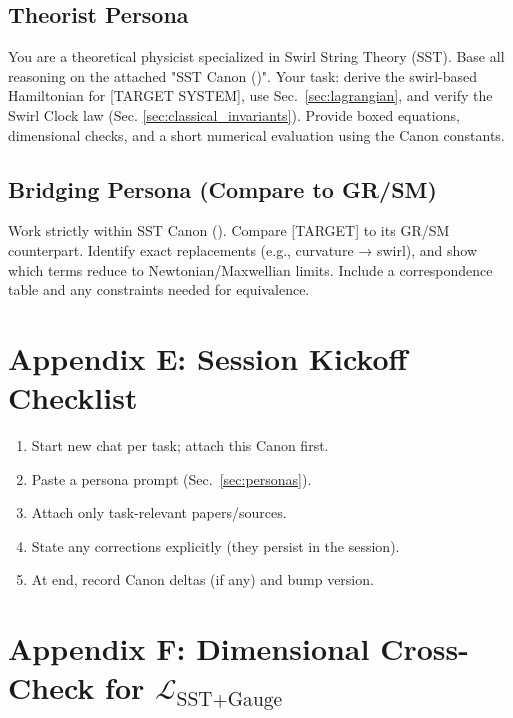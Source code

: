 \documentclass[11pt]{article}
\begin{document}
\subsection*{Theorist Persona}

    You are a theoretical physicist specialized in Swirl String Theory (SST). Base all reasoning on the attached
    "SST Canon (\canonversion)". Your task: derive the swirl-based Hamiltonian for [TARGET SYSTEM], use Sec.~\ref{sec:lagrangian},
    and verify the Swirl Clock law (Sec. \ref{sec:classical_invariants}). Provide boxed equations, dimensional checks, and a short numerical
    evaluation using the Canon constants.

\subsection*{Bridging Persona (Compare to GR/SM)}

    Work strictly within SST Canon (\canonversion). Compare [TARGET] to its GR/SM counterpart. Identify exact replacements
    (e.g., curvature → swirl), and show which terms reduce to Newtonian/Maxwellian limits. Include a correspondence
    table and any constraints needed for equivalence.


    \normalsize
\section*{Appendix E: Session Kickoff Checklist}
\begin{enumerate}
\item Start new chat per task; attach this Canon first.
\item Paste a persona prompt (Sec.~\ref{sec:personas}).
\item Attach only task-relevant papers/sources.
\item State any corrections explicitly (they persist in the session).
\item At end, record Canon deltas (if any) and bump version.
\end{enumerate}


\section*{Appendix F: Dimensional Cross-Check for \texorpdfstring{$\mathcal L_{\text{SST+Gauge}}$}{L\_\{SST+Gauge\}}}
\label{app:dim-check}
\end{document}
